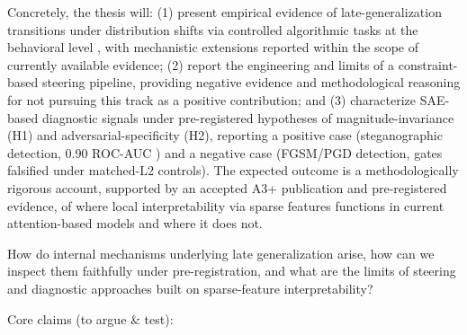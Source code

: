 ﻿\documentclass[../ppgc-tese.tex]{subfiles}
\begin{document}
Concretely, the thesis will:
(1) present empirical evidence of late-generalization transitions under distribution shifts via controlled algorithmic tasks at the behavioral level \cite{carvalho2025inducing_grokking_distribution_shifts}, with mechanistic extensions reported within the scope of currently available evidence;
(2) report the engineering and limits of a constraint-based steering pipeline, providing negative evidence and methodological reasoning for not pursuing this track as a positive contribution; and
(3) characterize SAE-based diagnostic signals under pre-registered hypotheses of magnitude-invariance (H1) and adversarial-specificity (H2), reporting a positive case (steganographic detection, 0.90 ROC-AUC \cite{carvalho2026interpretable_stego_detection_sae}) and a negative case (FGSM/PGD detection, gates falsified under matched-L2 controls).
The expected outcome is a methodologically rigorous account, supported by an accepted A3+ publication and pre-registered evidence, of where local interpretability via sparse features functions in current attention-based models and where it does not.

How do internal mechanisms underlying late generalization arise, how can we inspect them faithfully under pre-registration, and what are the limits of steering and diagnostic approaches built on sparse-feature interpretability?

Core claims (to argue \& test):
\end{document}
